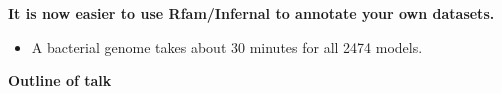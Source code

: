 \documentclass[landscape]{slides}
\begin{document}
\begin{slide}
\begin{slide}

\vfill
\vfill
\small
{} 
\end{slide}
\begin{slide}
\begin{center}
\textbf{It is now easier to use Rfam/Infernal to annotate your own
  datasets.} \\

\small
\begin{itemize}
\item A bacterial genome takes about 30 minutes for all 2474 models.
\end{itemize}

\end{center}


\vfill
\small
{} 
\end{slide}
\begin{slide}
\begin{center}
\textbf{Outline of talk}


\end{center}
\end{slide}
\end{slide}
\end{document}
